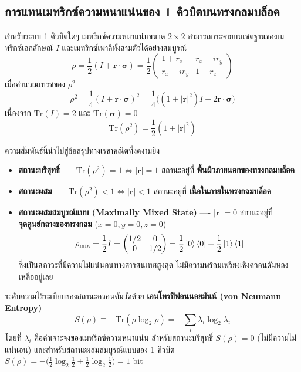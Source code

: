 \subsection{การแทนเมทริกซ์ความหนาแน่นของ 1 คิวบิตบนทรงกลมบล็อค}
สำหรับระบบ 1 คิวบิตใดๆ เมทริกซ์ความหนาแน่นขนาด $2 \times 2$ สามารถกระจายบนเซตฐานของเมทริกซ์เอกลักษณ์ $I$ และเมทริกซ์เพาลีทั้งสามตัวได้อย่างสมบูรณ์
\begin{equation}
\rho = \frac{1}{2} (I + \mathbf{r}\cdot\boldsymbol{\sigma}) = \frac{1}{2} \begin{pmatrix} 1 + r_z & r_x - i r_y \\ r_x + i r_y & 1 - r_z \end{pmatrix}
\label{eq:density_matrix_bloch}
\end{equation}
เมื่อคำนวณเทรซของ $\rho^2$
\begin{equation}
\rho^2 = \frac{1}{4}(I + \mathbf{r}\cdot\boldsymbol{\sigma})^2 = \frac{1}{4}\big( (1 + |\mathbf{r}|^2)I + 2\mathbf{r}\cdot\boldsymbol{\sigma} \big)
\end{equation}
เนื่องจาก $\text{Tr}(I) = 2$ และ $\text{Tr}(\boldsymbol{\sigma}) = 0$
\begin{equation}
\text{Tr}(\rho^2) = \frac{1}{2}(1 + |\mathbf{r}|^2)
\end{equation}

ความสัมพันธ์นี้นำไปสู่ข้อสรุปทางเรขาคณิตที่งดงามยิ่ง
\begin{itemize}
    \item \textbf{สถานะบริสุทธิ์} ---- $\text{Tr}(\rho^2) = 1 \iff |\mathbf{r}| = 1$ สถานะอยู่ที่ \textbf{พื้นผิวภายนอกของทรงกลมบล็อค}
    \item \textbf{สถานะผสม} ---- $\text{Tr}(\rho^2) < 1 \iff |\mathbf{r}| < 1$ สถานะอยู่ที่ \textbf{เนื้อในภายในทรงกลมบล็อค}
    \item \textbf{สถานะผสมสมบูรณ์แบบ (Maximally Mixed State)} ---- $|\mathbf{r}| = 0$ สถานะอยู่ที่ \textbf{จุดศูนย์กลางของทรงกลม} ($x=0, y=0, z=0$)
    \begin{equation}
    \rho_{\text{mix}} = \frac{1}{2} I = \begin{pmatrix} 1/2 & 0 \\ 0 & 1/2 \end{pmatrix} = \frac{1}{2}\ket{0}\bra{0} + \frac{1}{2}\ket{1}\bra{1}
    \end{equation}
    ซึ่งเป็นสภาวะที่มีความไม่แน่นอนทางสารสนเทศสูงสุด ไม่มีความพร้อมเพรียงเชิงควอนตัมหลงเหลืออยู่เลย
\end{itemize}

ระดับความไร้ระเบียบของสถานะควอนตัมวัดด้วย \textbf{เอนโทรปีฟอนนอยมันน์ (von Neumann Entropy)}
\begin{equation}
S(\rho) \equiv -\text{Tr}(\rho \log_2 \rho) = -\sum_i \lambda_i \log_2 \lambda_i
\label{eq:von_neumann_entropy}
\end{equation}
โดยที่ $\lambda_i$ คือค่าเจาะจงของเมทริกซ์ความหนาแน่น สำหรับสถานะบริสุทธิ์ $S(\rho) = 0$ (ไม่มีความไม่แน่นอน) และสำหรับสถานะผสมสมบูรณ์แบบของ 1 คิวบิต $S(\rho) = -\big( \frac{1}{2}\log_2\frac{1}{2} + \frac{1}{2}\log_2\frac{1}{2} \big) = 1\text{ bit}$

